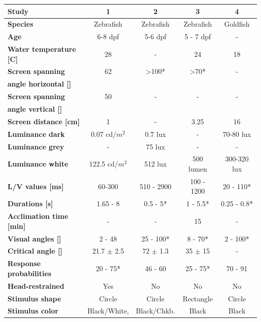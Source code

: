 	\begin{table} [!th]
		\begin{center}
			\begin{tabular}{l|c|c|c|c}
				\textbf{Study} & \textbf{1} & \textbf{2} & \textbf{3} & \textbf{4}\\
				\hline
				\textbf{Species} & Zebrafish & Zebrafish & Zebrafish & Goldfish\\
				\textbf{Age} & 6-8 dpf & 5-6 dpf & 5 - 7 dpf & -\\
				\textbf{Water temperature [\textdegree C]} & 28  & - & 24  & 18 \\
				\textbf{Screen spanning} & 62 & >100* & >70* & -\\
				\textbf{angle horizontal [\textdegree]} & & & & \\
				\textbf{Screen spanning} & 50 & - & - & -\\
				\textbf{angle vertical [\textdegree]} & & & & \\
				\textbf{Screen distance [cm]} & 1 & - & 3.25 & 16\\
				\textbf{Luminance dark} & 0.07 cd/$m^2$ & 0.7 lux & - & 70-80 lux\\
				\textbf{Luminance grey} & - & 75 lux & - & -\\
				\textbf{Luminance white} & 122.5 cd/$m^2$ & 512 lux & 500 lumen & 300-320 lux\\
				\textbf{L/V values [ms]} & 60-300 \dag & 510 - 2900 \dag & 100 - 
				1200 & 20 - 110*\\
				\textbf{Durations [s]} & 1.65 - 8 & 0.5 - 5* & 1 - 5.5* & 0.25 - 0.8*\\
				\textbf{Acclimation time [min]} & - & - & 15 & -\\
				\textbf{Visual angles [\textdegree]} & 2 - 48 & 25 - 100* & 8 - 70* & 2 - 100*\\
				\textbf{Critical angle [\textdegree]} & 21.7 $\pm$ 2.5 & 72 $\pm$ 1.3 & 35 $\pm$ 15 
				& -\\
				\textbf{Response probabilities} & 20 - 75* & 46 - 60 & 25 - 75* & 70 - 91\\
				\textbf{Head-restrained} & Yes & No & No & No\\
				\textbf{Stimulus shape} & Circle & Circle & Rectangle & Circle\\
				\textbf{Stimulus color} & Black/White, & Black/Chkb. & Black & Black\\

\end{tabular}
\end{center}
\end{table}
